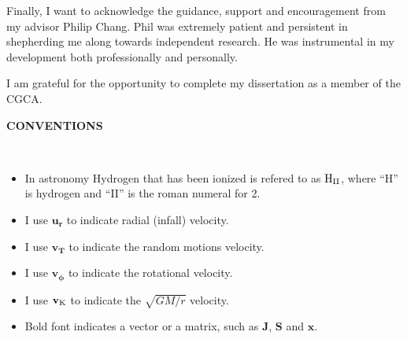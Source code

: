 \documentclass[12pt,notitlepage]{report}
\newcommand{\dblspc}{\setstretch{1.6}}
\newcommand{\ur}{\mathbf{u_r}}
\newcommand{\vt}{\mathbf{v_T}}
\newcommand{\vkep}{\mathbf{v_{\rm K}}}
\newcommand{\vphi}{\mathbf{v_\phi}}
\newcommand{\HII}{{\rm H}_{\rm II}}
\begin{document}
Finally, I want to acknowledge the guidance, support and encouragement from my advisor Philip Chang. 
Phil was extremely patient and persistent in shepherding me along towards independent research. 
He was instrumental in my development both professionally and personally. 

I am grateful for the opportunity to complete my dissertation as a member of the CGCA.

\newpage

\begin{center}
{\Large \bf CONVENTIONS}
\end{center}
\ \\

\begin{itemize} 

\item In astronomy Hydrogen that has been ionized is refered to as $\HII$, where ``H'' is hydrogen and ``II'' is the roman numeral for 2. 

\item I use $\ur$ to indicate radial (infall) velocity.

\item I use $\vt$ to indicate the random motions velocity.

\item I use $\vphi$ to indicate the rotational velocity.

\item I use $\vkep$ to indicate the $\sqrt{GM/r}$ velocity.

\item Bold font indicates a vector or a matrix, such as $\mathbf{J}$, $\mathbf{S}$ and $\mathbf{x}$.

\end{itemize}

\dblspc %

\newpage

%
\pagestyle{uwmheadings}

\pagestyle{fancy} \lhead{} \chead{} \rhead{} \lfoot{} \cfoot{\thepage} \rfoot{}



\end{document}
